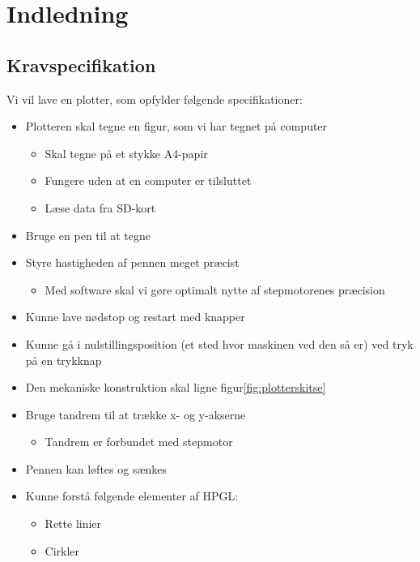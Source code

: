 \chapter{Indledning}




\section{Kravspecifikation}

Vi vil lave en plotter, som opfylder følgende specifikationer:
\begin{itemize}
\item Plotteren skal tegne en figur, som vi har tegnet på computer
\begin{itemize}
\item Skal tegne på et stykke A4-papir
\item Fungere uden at en computer er tilsluttet
\item Læse data fra SD-kort
\end{itemize}
\item Bruge en pen til at tegne
\item Styre hastigheden af pennen meget præcist
\begin{itemize}
\item Med software skal vi gøre optimalt nytte af stepmotorenes præcision
\end{itemize}
\item Kunne lave nødstop og restart med knapper
\item Kunne gå i nulstillingsposition (et sted hvor maskinen ved den så er) ved tryk på en trykknap
\item Den mekaniske konstruktion skal ligne figur\vref{fig:plotterskitse}
\item Bruge tandrem til at trække x- og y-akserne
\begin{itemize}
\item Tandrem er forbundet med stepmotor
\end{itemize}
\item Pennen kan løftes og sænkes
\item Kunne forstå følgende elementer af HPGL:
\begin{itemize}
\item Rette linier
\item Cirkler
\end{itemize}
\end{itemize}



